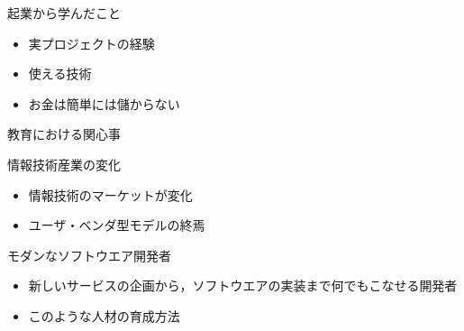 \documentclass[12pt, t, aspectratio=169]{beamer}
\begin{document}
\begin{frame}[label=sec-1-1-7]{起業から学んだこと}
\begin{itemize}
\item 実プロジェクトの経験
\item 使える技術
\item お金は簡単には儲からない
\end{itemize}
\end{frame}
\begin{frame}[label=sec-1-1-8]{教育における関心事}
\begin{block}{情報技術産業の変化}
\begin{itemize}
\item 情報技術のマーケットが変化
\item ユーザ・ベンダ型モデルの終焉
\end{itemize}
\end{block}
\begin{block}{モダンなソフトウエア開発者}
\begin{itemize}
\item 新しいサービスの企画から，ソフトウエアの実装まで何でもこなせる開発者
\item このような人材の育成方法
\end{itemize}
\end{block}
\end{frame}
\end{document}
